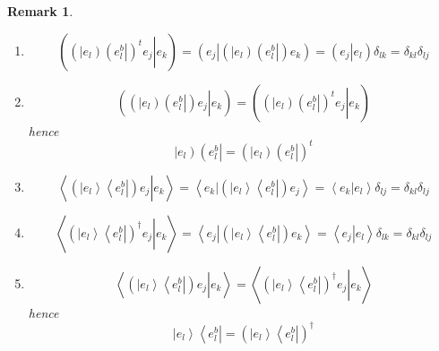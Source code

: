 \documentclass[aps,preprint]{revtex4}%
\newtheorem{remark}[theorem]{Remark}
\begin{document}
\begin{remark}
\begin{enumerate}
\begin{enumerate}
\item
\begin{equation}
\left(  \left.  \overset{}{\left(  \left\vert e_{l}\right)  \left(  e_{l}%
^{b}\right\vert \right)  ^{t}}e_{j}\right\vert e_{k}\right)  =\left(  \left.
\overset{}{e_{j}}\right\vert \left(  \left\vert e_{l}\right)  \left(
e_{l}^{b}\right\vert \right)  e_{k}\right)  =\left(  \left.  e_{j}\right\vert
e_{l}\right)  \delta_{lk}=\delta_{kl}\delta_{lj}%
\end{equation}


\item
\begin{equation}
\left(  \left.  \overset{}{\left(  \left\vert e_{l}\right)  \left(  e_{l}%
^{b}\right\vert \right)  }e_{j}\right\vert e_{k}\right)  =\left(  \left.
\overset{}{\left(  \left\vert e_{l}\right)  \left(  e_{l}^{b}\right\vert
\right)  ^{t}}e_{j}\right\vert e_{k}\right)
\end{equation}
hence
\begin{equation}
\left\vert e_{l}\right)  \left(  e_{l}^{b}\right\vert =\left(  \left\vert
e_{l}\right)  \left(  e_{l}^{b}\right\vert \right)  ^{t}%
\end{equation}


\item
\begin{equation}
\left\langle \left.  \overset{}{\left(  \left\vert e_{l}\right\rangle
\left\langle e_{l}^{b}\right\vert \right)  }e_{j}\right\vert e_{k}%
\right\rangle =\left\langle \left.  \overset{}{e_{k}}\right\vert \left(
\left\vert e_{l}\right\rangle \left\langle e_{l}^{b}\right\vert \right)
e_{j}\right\rangle =\left\langle \left.  \overset{}{e_{k}}\right\vert
e_{l}\right\rangle \delta_{lj}=\delta_{kl}\delta_{lj}%
\end{equation}


\item
\begin{equation}
\left\langle \left.  \overset{}{\left(  \left\vert e_{l}\right\rangle
\left\langle e_{l}^{b}\right\vert \right)  ^{\dagger}}e_{j}\right\vert
e_{k}\right\rangle =\left\langle \left.  \overset{}{e_{j}}\right\vert \left(
\left\vert e_{l}\right\rangle \left\langle e_{l}^{b}\right\vert \right)
e_{k}\right\rangle =\left\langle \left.  e_{j}\right\vert e_{l}\right\rangle
\delta_{lk}=\delta_{kl}\delta_{lj}%
\end{equation}


\item
\begin{equation}
\left\langle \left.  \overset{}{\left(  \left\vert e_{l}\right\rangle
\left\langle e_{l}^{b}\right\vert \right)  }e_{j}\right\vert e_{k}%
\right\rangle =\left\langle \left.  \overset{}{\left(  \left\vert
e_{l}\right\rangle \left\langle e_{l}^{b}\right\vert \right)  ^{\dagger}}%
e_{j}\right\vert e_{k}\right\rangle
\end{equation}
hence
\begin{equation}
\left\vert e_{l}\right\rangle \left\langle e_{l}^{b}\right\vert =\left(
\left\vert e_{l}\right\rangle \left\langle e_{l}^{b}\right\vert \right)
^{\dagger}%
\end{equation}


\end{enumerate}
\end{enumerate}
\end{remark}
\end{document}
